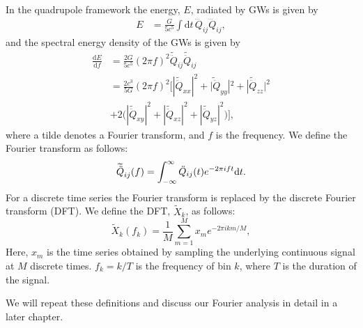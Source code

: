 In the quadrupole framework the energy, $E$, radiated by GWs is given by 
\begin{align} \label{eqT:energy}
E &=\frac{G}{5 c^5} \int \mathrm{d}t \, \dddot{Q}_{ij} \dddot{Q}_{ij},
\end{align}
and the spectral energy density of the GWs is given by 
\begin{align} \label{eqT:dedf}
\frac{\mathrm{d} E}{\mathrm{d} f} &= \frac{2G}{5 c^5} (2\pi f)^2 \widetilde{\ddot{Q}}_{ij} \widetilde{\ddot{Q}}_{ij} \nonumber \\
&=\frac{2 c^3}{5 G} (2\pi f)^2 \bigg[|\widetilde{\ddot{Q}}_{xx}|^2+\widetilde{|\ddot{Q}}_{yy}|^2+|\widetilde{\ddot{Q}}_{zz}|^2 \nonumber \\
&+2\big( |\widetilde{\ddot{Q}}_{xy}|^2 + |\widetilde{\ddot{Q}}_{xz}|^2+|\widetilde{\ddot{Q}}_{yz}|^2 \big)\bigg],
\end{align}
where a tilde denotes a Fourier transform, and $f$ is the
frequency. We define the Fourier transform as follows:
\begin{equation}
\widetilde{\ddot{Q}}_{ij}(f) = \int_{-\infty}^{\infty} \ddot{Q}_{ij}(t) e^{-2 \pi i f t} \mathrm{d} t. 
\end{equation}
For a discrete time series the Fourier transform is replaced by the discrete Fourier transform (DFT).
We define the DFT, $\widetilde{X}_k$, as follows: 
\begin{equation} \label{eq:DFT}
\widetilde{X}_k (f_k) = \frac{1}{M}  \sum^M_{m=1} x_m e^{-2\pi i k m/M},
\end{equation}
Here, $x_m$ is the time series obtained by sampling the underlying continuous signal at $M$ discrete times. 
$f_k = k/T$ is the frequency of bin $k$, where $T$ is the duration of the signal.

We will repeat these definitions and discuss our Fourier analysis in detail in a later chapter. 
